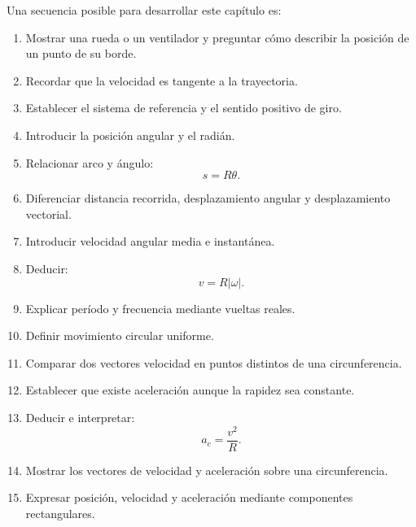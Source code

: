 \begin{notapedagogica}

Una secuencia posible para desarrollar este capítulo es:

\begin{enumerate}

    \item Mostrar una rueda o un ventilador y preguntar cómo describir la
    posición de un punto de su borde.

    \item Recordar que la velocidad es tangente a la trayectoria.

    \item Establecer el sistema de referencia y el sentido positivo de giro.

    \item Introducir la posición angular y el radián.

    \item Relacionar arco y ángulo:
    \[
    s=R\theta.
    \]

    \item Diferenciar distancia recorrida, desplazamiento angular y
    desplazamiento vectorial.

    \item Introducir velocidad angular media e instantánea.

    \item Deducir:
    \[
    v=R|\omega|.
    \]

    \item Explicar período y frecuencia mediante vueltas reales.

    \item Definir movimiento circular uniforme.

    \item Comparar dos vectores velocidad en puntos distintos de una
    circunferencia.

    \item Establecer que existe aceleración aunque la rapidez sea constante.

    \item Deducir e interpretar:
    \[
    a_c=\frac{v^2}{R}.
    \]

    \item Mostrar los vectores de velocidad y aceleración sobre una
    circunferencia.

    \item Expresar posición, velocidad y aceleración mediante componentes
    rectangulares.


\end{enumerate}
\end{notapedagogica}
